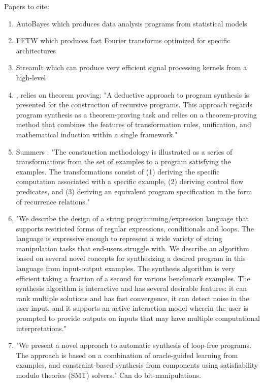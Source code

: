 Papers to cite:
\begin{enumerate}
\item AutoBayes \cite{Fischer:2003:ASG:967842.967845} which produces data analysis programs from statistical models
\item FFTW \cite{Frigo98fftw:an} which produces fast Fourier transforms optimized for specific architectures
\item StreamIt \cite{Thies2002} which can produce very efficient signal processing kernels from a high-level
\item \cite{Manna:1980:DAP:357084.357090}, relies on theorem proving: "A deductive approach to program synthesis is presented for the construction of recursive programs. This approach regards program synthesis as a theorem-proving task and relies on a theorem-proving method that combines the features of transformation rules, unification, and mathematical induction within a single framework."
\item Summers \cite{Summers:1977:MLP:321992.322002}. "The construction methodology is illustrated as a series of transformations from the set of examples to a program satisfying the examples. The transformations consist of (1) deriving the specific computation associated with a specific example, (2) deriving control flow predicates, and (3) deriving an equivalent program specification in the form of recurrence relations."
\item \cite{Gulwani:2011:ASP:1926385.1926423} "We describe the design of a string programming/expression language that supports restricted forms of regular expressions, conditionals and loops. The language is expressive enough to represent a wide variety of string manipulation tasks that end-users struggle with. We describe an algorithm based on several novel concepts for synthesizing a desired program in this language from input-output examples. The synthesis algorithm is very efficient taking a fraction of a second for various benchmark examples. The synthesis algorithm is interactive and has several desirable features: it can rank multiple solutions and has fast convergence, it can detect noise in the user input, and it supports an active interaction model wherein the user is prompted to provide outputs on inputs that may have multiple computational interpretations."
\item \cite{Jha:2010:OCP:1806799.1806833} "We present a novel approach to automatic synthesis of loop-free programs. The approach is based on a combination of oracle-guided learning from examples, and constraint-based synthesis from components using satisfiability modulo theories (SMT) solvers." Can do bit-manipulations.

\end{enumerate}
